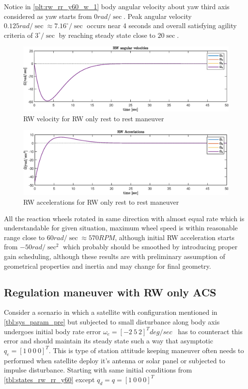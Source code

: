 \noindent Notice in \autoref{plt:rw_rr_y60_w_1} body angular velocity about yaw third axis considered as yaw starts from $0 rad/\sec$. Peak angular velocity $0.125 rad/\sec \approx 7.16^\circ/\sec$ occurs near 4 seconds and overall satisfying agility criteria of $3^\circ/\sec$ by reaching steady state close to $20 \sec$.

\begin{figure}[H]
    \centering
    \includegraphics[width=0.9\columnwidth]{figures/plots/RW/rw_rr_y60_Om.eps}
    \caption{RW velocity for RW only rest to rest maneuver}
    \label{plt:rw_rr_y60_Om_1}
\end{figure}

\begin{figure}[H]
    \centering
    \includegraphics[width=0.8\columnwidth]{figures/plots/RW/rw_rr_y60_Om_dot.eps}
    \caption{RW accelerations for RW only rest to rest maneuver}
    \label{plt:rw_rr_y60_Om_dot_1}
\end{figure}

\noindent All the reaction wheels rotated in same direction with almost equal rate which is understandable for given situation, maximum wheel speed is within reasonable range close to $60 rad/\sec \approx 570 RPM$, although initial RW acceleration starts from $-50 rad/\sec^2$ which probably should be smoothed by introducing proper gain scheduling, although these results are with preliminary assumption of geometrical properties and inertia and may change for final geometry.


\subsection{Regulation maneuver with RW only ACS}
Consider a scenario in which a satellite with configuration mentioned in \autoref{tbl:sys_param_pre} but subjected to small disturbance along body axis undergoes initial body rate error $\displaystyle \omega _{e} =[ -2\ 5\ 2]^{T} deg/sec$ \ has to counteract this error and should maintain its steady state such a way that asymptotic $\displaystyle q_{e} =[ 1\ 0\ 0\ 0]^{T}$. This is type of station attitude keeping maneuver often needs to performed when satellite deploy it's antenna or solar panel or subjected to impulse disturbance. Starting with same initial conditions from \autoref{tbl:states_rw_rr_y60} except $\displaystyle q_{d} =q=[ 1\ 0\ 0\ 0]^{T}$

